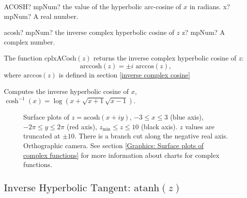 \begin{mpFunctionsExtract}
	\mpWorksheetFunctionOneNotImplemented
	{ACOSH? mpNum? the value of the hyperbolic arc-cosine  of $x$ in radians.}
	{x? mpNum? A real number.}
\end{mpFunctionsExtract}

\vspace{0.6cm}


\begin{mpFunctionsExtract}
	\mpFunctionOne
	{acosh? mpNum? the inverse complex hyperbolic cosine of $z$}
	{z? mpNum? A complex number.}
\end{mpFunctionsExtract}

\vspace{0.3cm}
The function \textsf{cplxACosh$(z)$} returns the inverse complex hyperbolic cosine of $z$: 
\begin{equation}
	\text{arccosh}(z) = \pm i \text{ arccos}(z),
\end{equation}
where $\text{arccos}(z)$ is defined in section \ref{inverse complex cosine}

Computes the inverse hyperbolic cosine of $x$, $\cosh^{-1}(x)=\log(x+\sqrt{x+1}\sqrt{x-1})$.

\begin{figure}[ht]%
	\centering
	\qquad
	\caption[Complex Inverse Hyperbolic Cosine]{Surface plots of $z = \text{acosh}(x + iy)$, $-3 \leq x \leq 3$ (blue axis), $-2 \pi \leq y \leq 2\pi$ (red axis), $z_{\text{min}} \leq z \leq 10$ (black axis). $z$ values are truncated at $\pm 10$. There is a branch cut along the negative real axis. Orthographic camera. See section \ref{Graphics: Surface plots of complex functions} for more information about charts for complex functions.} 
	\label{fig:Complex Inverse Hyperbolic Cosine}%
\end{figure}


\newpage
\subsection{\texorpdfstring{$\text{Inverse Hyperbolic Tangent: atanh}(z)$}{atanh}}

